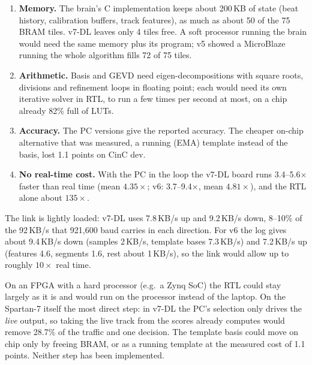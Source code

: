 \documentclass[11pt]{article}
\newcommand{\mods}[1]{\texttt{\detokenize{#1}}}   %
\begin{document}
\begin{enumerate}
  \item \textbf{Memory.} The brain's C implementation keeps about 200\,KB of state (beat history, calibration buffers, track features), as much as about 50 of the 75 BRAM tiles. v7-DL leaves only 4 tiles free. A soft processor running the brain would need the same memory plus its program; v5 showed a MicroBlaze running the whole algorithm fills 72 of 75 tiles.
  \item \textbf{Arithmetic.} Basis and GEVD need eigen-decompositions with square roots, divisions and refinement loops in floating point; each would need its own iterative solver in RTL, to run a few times per second at most, on a chip already 82\% full of LUTs.
  \item \textbf{Accuracy.} The PC versions give the reported accuracy. The cheaper on-chip alternative that was measured, a running (EMA) template instead of the basis, lost 1.1 points on CinC dev.
  \item \textbf{No real-time cost.} With the PC in the loop the v7-DL board runs 3.4--5.6$\times$ faster than real time (mean $4.35\times$; v6: 3.7--9.4$\times$, mean $4.81\times$), and the RTL alone about $135\times$.
\end{enumerate}
The link is lightly loaded: v7-DL uses 7.8\,KB/s up and 9.2\,KB/s down, 8--10\% of the 92\,KB/s that 921,600 baud carries in each direction. For v6 the log gives about 9.4\,KB/s down (samples 2\,KB/s, template bases 7.3\,KB/s) and 7.2\,KB/s up (features 4.6, segments 1.6, rest about 1\,KB/s), so the link would allow up to roughly $10\times$ real time.

\begin{keyfact}
On an FPGA with a hard processor (e.g.\ a Zynq SoC) the RTL could stay largely as it is and  would run on the processor instead of the laptop. On the Spartan-7 itself the most direct step: in v7-DL the PC's selection only drives the \emph{live} output, so taking the live track from the scores \mods{v7_la} already computes would remove 28.7\% of the traffic and one decision. The template basis could move on chip only by freeing BRAM, or as a running template at the measured cost of 1.1 points. Neither step has been implemented.
\end{keyfact}
\end{document}
